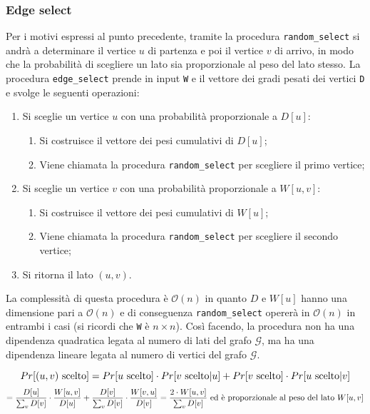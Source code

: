 \subsubsection*{Edge select}
Per i motivi espressi al punto 
precedente, tramite la procedura \verb|random_select| si andrà a determinare il 
vertice $u$ di partenza e poi il vertice $v$ di arrivo, in modo che la probabilità 
di scegliere un lato sia proporzionale al peso del lato stesso. La procedura 
\verb|edge_select| prende in input \verb|W| e il vettore dei gradi pesati dei 
vertici \verb|D| e svolge le seguenti operazioni:
\begin{enumerate}
    \item Si sceglie un vertice $u$ con una probabilità proporzionale a $D[u]$:
    \begin{enumerate}
        \item Si costruisce il vettore dei pesi cumulativi di $D[u]$;
        \item Viene chiamata la procedura \verb|random_select| per scegliere il 
        primo vertice;
    \end{enumerate}
    \item Si sceglie un vertice $v$ con una probabilità proporzionale a $W[u,v]$:
    \begin{enumerate}
        \item Si costruisce il vettore dei pesi cumulativi di $W[u]$;
        \item Viene chiamata la procedura \verb|random_select| per scegliere il 
        secondo vertice;
    \end{enumerate}
    \item Si ritorna il lato $(u,v)$.
\end{enumerate}
La complessità di questa procedura è $\mathcal{O}(n)$ in quanto $D$ e $W[u]$ 
hanno una dimensione pari a $\mathcal{O}(n)$ e di conseguenza \verb|random_select| 
opererà in $\mathcal{O}(n)$ in entrambi i casi (si ricordi che \verb|W| è 
$n \times n$). Così facendo, la procedura non ha una dipendenza quadratica legata 
al numero di lati del grafo $\mathcal{G}$, ma ha una dipendenza lineare legata al 
numero di vertici del grafo $\mathcal{G}$.

\[
    Pr[(u,v) \textnormal{ scelto}] = Pr[u \textnormal{ scelto}] \cdot 
    Pr[v \textnormal{ scelto} | u] + Pr[v \textnormal{ scelto}] \cdot 
    Pr[u \textnormal{ scelto} | v]
\]
\[
    = \frac{D[u]}{\sum_v D[v]} \cdot \frac{W[u,v]}{D[u]} + \frac{D[v]}{\sum_v D[v]} 
    \cdot \frac{W[v,u]}{D[v]} =
    \frac{2 \cdot W[u,v]}{\sum_v D[v]} \textnormal{ ed è proporzionale al peso del lato } W[u,v]
\]

